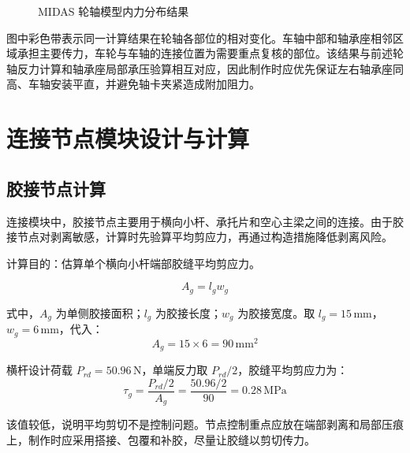 \documentclass[UTF8,a4paper,12pt,fontset=none]{ctexart}
\numberwithin{equation}{section}
\numberwithin{figure}{section}
\numberwithin{table}{section}
\newcommand{\mm}{\,\mathrm{mm}}
\newcommand{\Nunit}{\,\mathrm{N}}
\newcommand{\MPa}{\,\mathrm{MPa}}
\begin{document}
\begin{figure}[H]
\caption{MIDAS 轮轴模型内力分布结果}
\label{fig:midas-wheel-force}
\end{figure}

图中彩色带表示同一计算结果在轮轴各部位的相对变化。车轴中部和轴承座相邻区域承担主要传力，车轮与车轴的连接位置为需要重点复核的部位。该结果与前述轮轴反力计算和轴承座局部承压验算相互对应，因此制作时应优先保证左右轴承座同高、车轴安装平直，并避免轴卡夹紧造成附加阻力。

\newpage
\section{连接节点模块设计与计算}

\subsection{胶接节点计算}
连接模块中，胶接节点主要用于横向小杆、承托片和空心主梁之间的连接。由于胶接节点对剥离敏感，计算时先验算平均剪应力，再通过构造措施降低剥离风险。

计算目的：估算单个横向小杆端部胶缝平均剪应力。

\begin{equation}
  A_g=l_gw_g
\end{equation}

式中，$A_g$ 为单侧胶接面积；$l_g$ 为胶接长度；$w_g$ 为胶接宽度。取 $l_g=15\mm$，$w_g=6\mm$，代入：
\begin{equation}
  A_g=15\times6=90\mm^2
\end{equation}

横杆设计荷载 $P_{rd}=50.96\Nunit$，单端反力取 $P_{rd}/2$，胶缝平均剪应力为：
\begin{equation}
  \tau_g=\frac{P_{rd}/2}{A_g}=\frac{50.96/2}{90}=0.28\MPa
\end{equation}

该值较低，说明平均剪切不是控制问题。节点控制重点应放在端部剥离和局部压痕上，制作时应采用搭接、包覆和补胶，尽量让胶缝以剪切传力。
\end{document}
